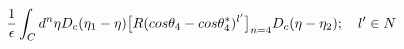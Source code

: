 \begin{equation}
\frac{1}{\epsilon}
\int_Cd^n\eta D_c(\eta_1 - \eta)\big{[}R(cos{\theta_4} - cos{\theta_4^*})^{l'}\big{]}_{n=4}
D_c(\eta - \eta_2);~~~l' \in N 
\end{equation}


